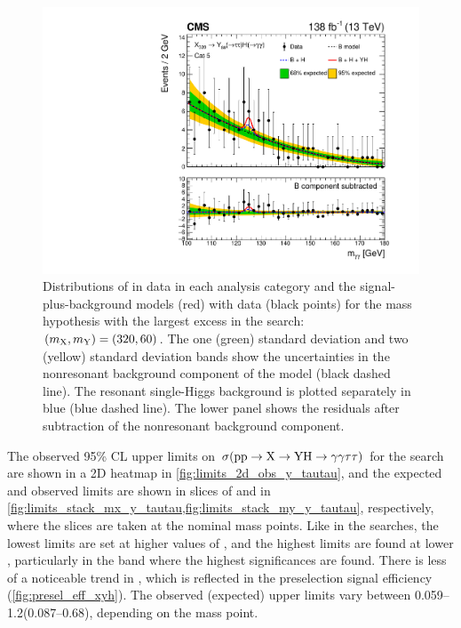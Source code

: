 \begin{figure}
    \includegraphics[width=.45\linewidth]{Figures/Dihiggs/results/sb_models/y_tautau/ARCGL_Y_tautau_mx320my60_ggttresmx320my60cat5_CMS_hgg_mass_nbins40_paper.pdf}
    \caption[Signal-Plus-Background Fits to Data for \XYttHgg Search at $(\mX,\mY)=(320,60)$\GeV]{Distributions of \mgg in data in each analysis category and the signal-plus-background models (red) with data (black points) for the mass hypothesis with the largest excess in the \XYttHgg search: $(\mX,\mY)=(320,60)$\GeV. The one (green) standard deviation and two (yellow) standard deviation bands show the uncertainties in the nonresonant background component of the model (black dashed line). The resonant single-Higgs background is plotted separately in blue (blue dashed line). The lower panel shows the residuals after subtraction of the nonresonant background component.}\label{fig:sbmodel_2}
\end{figure}

The observed 95\% CL upper limits on $\sigma(\mathrm{p}\mathrm{p} \to \mathrm{X} \to \mathrm{Y}\mathrm{H} \to \gamma\gamma\tau\tau)$ for the \XYttHgg search are shown in a 2D heatmap in \cref{fig:limits_2d_obs_y_tautau}, and the expected and observed limits are shown in slices of \mX and \mY in \cref{fig:limits_stack_mx_y_tautau,fig:limits_stack_my_y_tautau}, respectively, where the slices are taken at the nominal mass points. Like in the \XHH searches, the lowest limits are set at higher values of \mX, and the highest limits are found at lower \mX, particularly in the band where the highest significances are found. There is less of a noticeable trend in \mY, which is reflected in the preselection signal efficiency (\cref{fig:presel_eff_xyh}). The observed (expected) upper limits vary between 0.059--1.2\fb (0.087--0.68\fb), depending on the mass point. 

